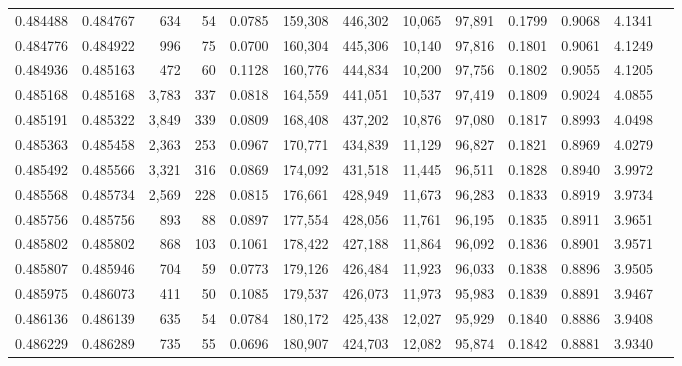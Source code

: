 \begin{tabular}{rrrrrrrrrrrrr}
0.484488 & 0.484767 &   634 &    54 &                                     0.0785 & 159,308 & 446,302 &  10,065 &  97,891 & 0.1799 & 0.9068 & 4.1341 \\
0.484776 & 0.484922 &   996 &    75 &                                     0.0700 & 160,304 & 445,306 &  10,140 &  97,816 & 0.1801 & 0.9061 & 4.1249 \\
0.484936 & 0.485163 &   472 &    60 &                                     0.1128 & 160,776 & 444,834 &  10,200 &  97,756 & 0.1802 & 0.9055 & 4.1205 \\
0.485168 & 0.485168 & 3,783 &   337 &                                     0.0818 & 164,559 & 441,051 &  10,537 &  97,419 & 0.1809 & 0.9024 & 4.0855 \\
0.485191 & 0.485322 & 3,849 &   339 &                                     0.0809 & 168,408 & 437,202 &  10,876 &  97,080 & 0.1817 & 0.8993 & 4.0498 \\
0.485363 & 0.485458 & 2,363 &   253 &                                     0.0967 & 170,771 & 434,839 &  11,129 &  96,827 & 0.1821 & 0.8969 & 4.0279 \\
0.485492 & 0.485566 & 3,321 &   316 &                                     0.0869 & 174,092 & 431,518 &  11,445 &  96,511 & 0.1828 & 0.8940 & 3.9972 \\
0.485568 & 0.485734 & 2,569 &   228 &                                     0.0815 & 176,661 & 428,949 &  11,673 &  96,283 & 0.1833 & 0.8919 & 3.9734 \\
0.485756 & 0.485756 &   893 &    88 &                                     0.0897 & 177,554 & 428,056 &  11,761 &  96,195 & 0.1835 & 0.8911 & 3.9651 \\
0.485802 & 0.485802 &   868 &   103 &                                     0.1061 & 178,422 & 427,188 &  11,864 &  96,092 & 0.1836 & 0.8901 & 3.9571 \\
0.485807 & 0.485946 &   704 &    59 &                                     0.0773 & 179,126 & 426,484 &  11,923 &  96,033 & 0.1838 & 0.8896 & 3.9505 \\
0.485975 & 0.486073 &   411 &    50 &                                     0.1085 & 179,537 & 426,073 &  11,973 &  95,983 & 0.1839 & 0.8891 & 3.9467 \\
0.486136 & 0.486139 &   635 &    54 &                                     0.0784 & 180,172 & 425,438 &  12,027 &  95,929 & 0.1840 & 0.8886 & 3.9408 \\
0.486229 & 0.486289 &   735 &    55 &                                     0.0696 & 180,907 & 424,703 &  12,082 &  95,874 & 0.1842 & 0.8881 & 3.9340 \\

\end{tabular}
